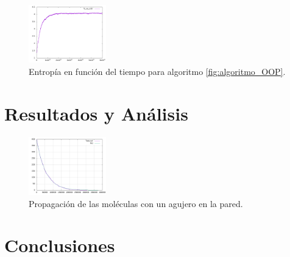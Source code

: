\documentclass[12pt,twocolumn]{article}
\begin{document}
\begin{figure}
    \centering
    \includegraphics[width=0.3\textwidth]{figs/S_vs_t_OOP_all.png}
    \caption{Entropía en función del tiempo para algoritmo \ref{fig:algoritmo_OOP}.}
    \label{fig:s_vs_t}
\end{figure}

\section{Resultados y Análisis}

\begin{figure}
    \centering
    \includegraphics[width=0.3\textwidth]{figs/hole.png}
    \caption{Propagación de las moléculas con un agujero en la pared.}
    \label{fig:hole}
\end{figure}




\section{Conclusiones}
\end{document}

